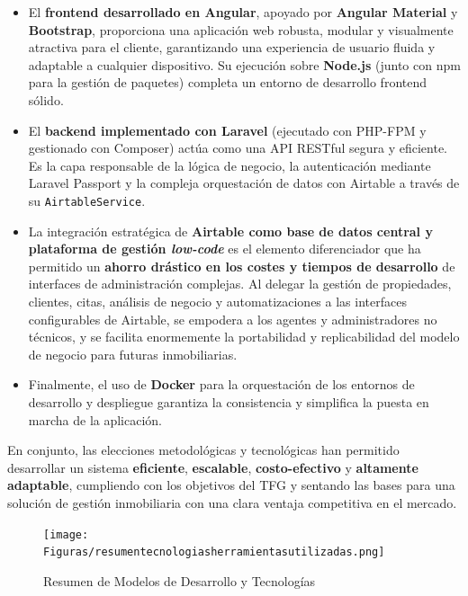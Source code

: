\begin{itemize}
    \item El \textbf{frontend desarrollado en Angular}, apoyado por \textbf{Angular Material} y \textbf{Bootstrap}, proporciona una aplicación web robusta, modular y visualmente atractiva para el cliente, garantizando una experiencia de usuario fluida y adaptable a cualquier dispositivo. Su ejecución sobre \textbf{Node.js} (junto con npm para la gestión de paquetes) completa un entorno de desarrollo frontend sólido.

    \item El \textbf{backend implementado con Laravel} (ejecutado con PHP-FPM y gestionado con Composer) actúa como una API RESTful segura y eficiente. Es la capa responsable de la lógica de negocio, la autenticación mediante Laravel Passport y la compleja orquestación de datos con Airtable a través de su \texttt{AirtableService}.

    \item La integración estratégica de \textbf{Airtable como base de datos central y plataforma de gestión \textit{low-code}} es el elemento diferenciador que ha permitido un \textbf{ahorro drástico en los costes y tiempos de desarrollo} de interfaces de administración complejas. Al delegar la gestión de propiedades, clientes, citas, análisis de negocio y automatizaciones a las interfaces configurables de Airtable, se empodera a los agentes y administradores no técnicos, y se facilita enormemente la portabilidad y replicabilidad del modelo de negocio para futuras inmobiliarias.

    \item Finalmente, el uso de \textbf{Docker} para la orquestación de los entornos de desarrollo y despliegue garantiza la consistencia y simplifica la puesta en marcha de la aplicación.
\end{itemize}

\clearpage

En conjunto, las elecciones metodológicas y tecnológicas han permitido desarrollar un sistema \textbf{eficiente}, \textbf{escalable}, \textbf{costo-efectivo} y\textbf{ altamente adaptable}, cumpliendo con los objetivos del TFG y sentando las bases para una solución de gestión inmobiliaria con una clara ventaja competitiva en el mercado.

\begin{figure}[H]
    \begin{center}
        \texttt{[image: Figuras/resumentecnologiasherramientasutilizadas.png]}
    \end{center}
    \caption{\label{fig:resumentecnologiasherramientasutilizadas} Resumen de Modelos de Desarrollo y Tecnologías}
\end{figure}

